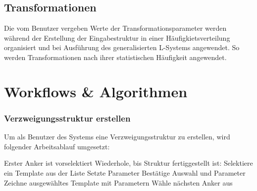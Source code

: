 \subsection*{Transformationen}
Die vom Benutzer vergeben Werte der Transformationsparameter werden während der Erstellung der Eingabestruktur in
einer Häufigkietsverteilung organisiert und bei Ausführung des generalisierten L-Systems angewendet.
So werden Transformationen nach ihrer statistischen Häufigkeit angewendet.

\newpage

\section{Workflows \& Algorithmen}
\label{algo}

\subsubsection*{Verzweigungsstruktur erstellen}
Um als Benutzer des Systems eine Verzweigungsstruktur zu erstellen, wird folgender Arbeitsablauf umgesetzt:
\begin{algorithm}[caption={Erstellen einer Verzweigungsstruktur}, label={alg1}]
    Erster Anker ist vorselektiert
    Wiederhole, bis Struktur fertiggestellt ist:
    Selektiere ein Template aus der Liste
    Setzte Parameter
    Bestätige Auswahl und Parameter
    Zeichne ausgewähltes Template mit Parametern
    Wähle nächsten Anker aus
\end{algorithm}

